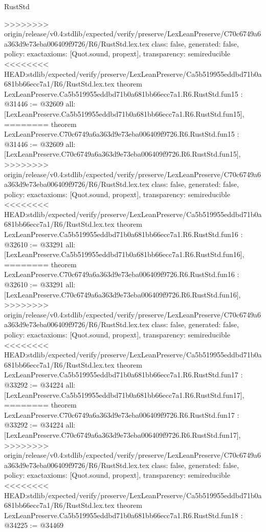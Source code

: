 \begin{lexlean}{RustStd}
\begin{coremodule}
{\begin{coremodule}
{{{{{{{{{{{{{{{{{{>>>>>>>> origin/release/v0.4:stdlib/expected/verify/preserve/LexLeanPreserve/C70c6749a6a363d9e73eba006409f9726/R6/RustStd.lex.tex
  class: false,
  generated: false,
  policy: exact{axioms: [Quot.sound, propext]},
  transparency: semireducible
}
<<<<<<<< HEAD:stdlib/expected/verify/preserve/LexLeanPreserve/Ca5b519955eddbd71b0a681bb66ecc7a1/R6/RustStd.lex.tex
theorem LexLeanPreserve.Ca5b519955eddbd71b0a681bb66ecc7a1.R6.RustStd.fun15 : @31446 := @32609 {
  all: [LexLeanPreserve.Ca5b519955eddbd71b0a681bb66ecc7a1.R6.RustStd.fun15],
========
theorem LexLeanPreserve.C70c6749a6a363d9e73eba006409f9726.R6.RustStd.fun15 : @31446 := @32609 {
  all: [LexLeanPreserve.C70c6749a6a363d9e73eba006409f9726.R6.RustStd.fun15],
>>>>>>>> origin/release/v0.4:stdlib/expected/verify/preserve/LexLeanPreserve/C70c6749a6a363d9e73eba006409f9726/R6/RustStd.lex.tex
  class: false,
  generated: false,
  policy: exact{axioms: [Quot.sound, propext]},
  transparency: semireducible
}
<<<<<<<< HEAD:stdlib/expected/verify/preserve/LexLeanPreserve/Ca5b519955eddbd71b0a681bb66ecc7a1/R6/RustStd.lex.tex
theorem LexLeanPreserve.Ca5b519955eddbd71b0a681bb66ecc7a1.R6.RustStd.fun16 : @32610 := @33291 {
  all: [LexLeanPreserve.Ca5b519955eddbd71b0a681bb66ecc7a1.R6.RustStd.fun16],
========
theorem LexLeanPreserve.C70c6749a6a363d9e73eba006409f9726.R6.RustStd.fun16 : @32610 := @33291 {
  all: [LexLeanPreserve.C70c6749a6a363d9e73eba006409f9726.R6.RustStd.fun16],
>>>>>>>> origin/release/v0.4:stdlib/expected/verify/preserve/LexLeanPreserve/C70c6749a6a363d9e73eba006409f9726/R6/RustStd.lex.tex
  class: false,
  generated: false,
  policy: exact{axioms: [Quot.sound, propext]},
  transparency: semireducible
}
<<<<<<<< HEAD:stdlib/expected/verify/preserve/LexLeanPreserve/Ca5b519955eddbd71b0a681bb66ecc7a1/R6/RustStd.lex.tex
theorem LexLeanPreserve.Ca5b519955eddbd71b0a681bb66ecc7a1.R6.RustStd.fun17 : @33292 := @34224 {
  all: [LexLeanPreserve.Ca5b519955eddbd71b0a681bb66ecc7a1.R6.RustStd.fun17],
========
theorem LexLeanPreserve.C70c6749a6a363d9e73eba006409f9726.R6.RustStd.fun17 : @33292 := @34224 {
  all: [LexLeanPreserve.C70c6749a6a363d9e73eba006409f9726.R6.RustStd.fun17],
>>>>>>>> origin/release/v0.4:stdlib/expected/verify/preserve/LexLeanPreserve/C70c6749a6a363d9e73eba006409f9726/R6/RustStd.lex.tex
  class: false,
  generated: false,
  policy: exact{axioms: [Quot.sound, propext]},
  transparency: semireducible
}
<<<<<<<< HEAD:stdlib/expected/verify/preserve/LexLeanPreserve/Ca5b519955eddbd71b0a681bb66ecc7a1/R6/RustStd.lex.tex
theorem LexLeanPreserve.Ca5b519955eddbd71b0a681bb66ecc7a1.R6.RustStd.fun18 : @34225 := @34469 {
}}}}}}}}}}}}}}}}}}}}}
\end{coremodule}}
\end{coremodule}
\end{lexlean}
